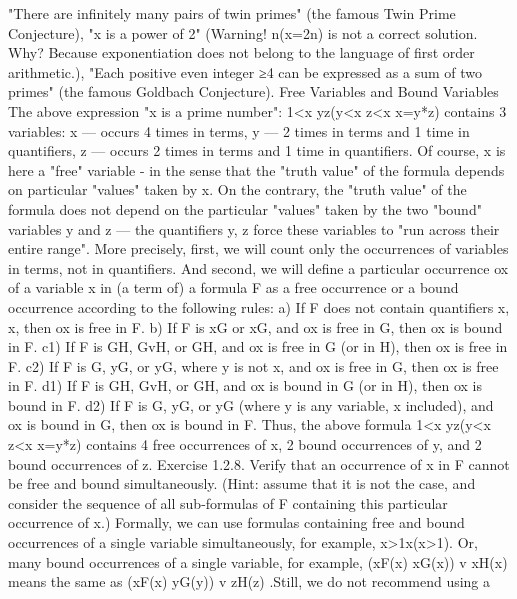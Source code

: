 "There are infinitely many pairs of twin primes" (the famous Twin Prime Conjecture),
"x is a power of 2" (Warning! \exists n(x=2n) is not a correct solution. Why? Because exponentiation does not
belong to the language of first order arithmetic.),
"Each positive even integer ≥4 can be expressed as a sum of two primes"
(the famous Goldbach Conjecture).
Free Variables and Bound Variables
The above expression "x is a prime number":
1<x \AND  \neg \exists y\exists z(y<x \AND  z<x \AND  x=y*z)
contains 3 variables: x --- occurs 4 times in terms, y --- 2 times in terms and 1 time in quantifiers, z --- occurs
2 times in terms and 1 time in quantifiers. Of course, x is here a "free" variable - in the sense that the
"truth value" of the formula depends on particular "values" taken by x. On the contrary, the "truth value"
of the formula does not depend on the particular "values" taken by the two "bound" variables y and z ---
the quantifiers \exists y, \exists z force these variables to "run across their entire range".
More precisely, first, we will count only the occurrences of variables in terms, not in quantifiers. And
second, we will define a particular occurrence ox of a variable x in (a term of) a formula F as a free
occurrence or a bound occurrence according to the following rules:
a) If F does not contain quantifiers \exists x, \forall x, then ox is free in F.
b) If F is \exists xG or \forall xG, and ox is free in G, then ox is bound in F.
c1) If F is G\AND H, GvH, or G\IMPLIES H, and ox is free in G (or in H), then ox is free in F.
c2) If F is \neg G, \exists yG, or \forall yG, where y is not x, and ox is free in G, then ox is free in F.
d1) If F is G\AND H, GvH, or G\IMPLIES H, and ox is bound in G (or in H), then ox is bound in F.
d2) If F is \neg G, \exists yG, or \forall yG (where y is any variable, x included), and ox is bound in G, then ox is bound
in F.
Thus, the above formula 1<x \AND  \neg \exists y\exists z(y<x \AND  z<x \AND  x=y*z) contains 4 free occurrences of x, 2 bound
occurrences of y, and 2 bound occurrences of z.
Exercise 1.2.8. Verify that an occurrence of x in F cannot be free and bound simultaneously. (Hint:
assume that it is not the case, and consider the sequence of all sub-formulas of F containing this particular
occurrence of x.)
Formally, we can use formulas containing free and bound occurrences of a single variable simultaneously,
for example, x>1\IMPLIES \exists x(x>1). Or, many bound occurrences of a single variable, for example, (\forall xF(x) \AND 
\exists xG(x)) v \forall xH(x) means the same as (\forall xF(x) \AND  \exists yG(y)) v \forall zH(z) .Still, we do not recommend using a
